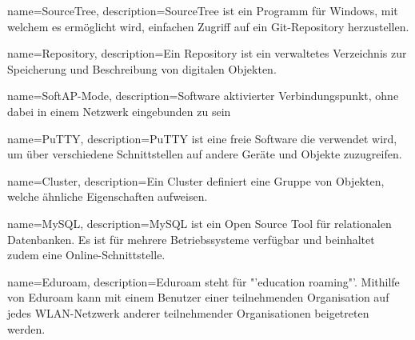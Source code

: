{
  name=SourceTree,
  description={SourceTree ist ein Programm für Windows, mit welchem es ermöglicht wird, einfachen Zugriff auf ein Git-Repository herzustellen. \cite{sourceTree}}
}

{
  name=Repository,
  description={Ein Repository ist ein verwaltetes Verzeichnis zur Speicherung und Beschreibung von digitalen Objekten.  \cite{rep}}
}

{
  name=SoftAP-Mode,
  description={Software aktivierter Verbindungspunkt, ohne dabei in einem Netzwerk eingebunden zu sein}
}

{
  name=PuTTY,
  description={PuTTY ist eine freie Software die verwendet wird, um über verschiedene Schnittstellen auf andere Geräte und Objekte zuzugreifen.  \cite{putt}}
}

{
  name=Cluster,
  description={Ein Cluster definiert eine Gruppe von Objekten, welche ähnliche Eigenschaften aufweisen.  \cite{cluster}}
}

{
  name=MySQL,
  description={MySQL ist ein Open Source Tool für relationalen Datenbanken. Es ist für mehrere Betriebssysteme verfügbar und beinhaltet zudem eine Online-Schnittstelle. \cite{mySQL}}
}

{
  name=Eduroam,
  description={Eduroam steht für "'education roaming"'. Mithilfe von Eduroam kann mit einem Benutzer einer teilnehmenden Organisation auf jedes WLAN-Netzwerk anderer teilnehmender Organisationen beigetreten werden. \cite{eduroam}}
}
\glsaddall
\printglossary[style=super, nonumberlist]